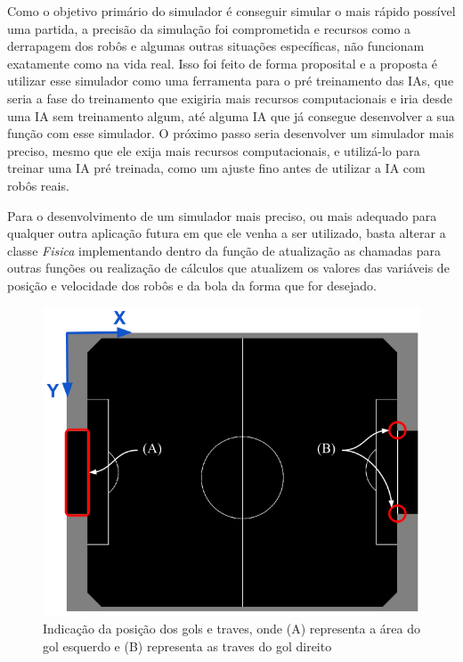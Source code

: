Como o objetivo primário do simulador é conseguir simular o mais rápido possível uma partida, a precisão da simulação foi comprometida e recursos como a derrapagem dos robôs e algumas outras situações específicas, não funcionam exatamente como na vida real. Isso foi feito de forma proposital e a proposta é utilizar esse simulador como uma ferramenta para o pré treinamento das IAs, que seria a fase do treinamento que exigiria mais recursos computacionais e iria desde uma IA sem treinamento algum, até alguma IA que já consegue desenvolver a sua função com esse simulador. O próximo passo seria desenvolver um simulador mais preciso, mesmo que ele exija mais recursos computacionais, e utilizá-lo para treinar uma IA pré treinada, como um ajuste fino antes de utilizar a IA com robôs reais.

Para o desenvolvimento de um simulador mais preciso, ou mais adequado para qualquer outra aplicação futura em que ele venha a ser utilizado, basta alterar a classe \textit{Fisica} implementando dentro da função de atualização as chamadas para outras funções ou realização de cálculos que atualizem os valores das variáveis de posição e velocidade dos robôs e da bola da forma que for desejado.

\begin{figure}[!htb]
    \caption{\label{img:campo_indicacao}Indicação da posição dos gols e traves, onde (A) representa a área do gol esquerdo e (B) representa as traves do gol direito}
	\begin{center}
        \includegraphics[scale=0.55]{img/campo_indicacoes.png}
	\end{center}
\end{figure}


